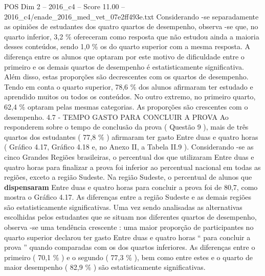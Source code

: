\begin{textsample}{POS Dim 2 – 2016\_c4 – Score 11.00 – 2016\_c4/enade\_2016\_med\_vet\_07e2ff493e.txt}
Considerando -se separadamente as opiniões de estudantes dos quatro quartos de desempenho, observa -se que, no quarto inferior, 3,2 \% ofereceram como resposta que não estudou ainda a maioria desses conteúdos, sendo 1,0 \% os do quarto superior com a mesma resposta.
A diferença entre os alunos que optaram por este motivo de dificuldade entre o primeiro e os demais quartos de desempenho é estatisticamente significativa.
Além disso, estas proporções são decrescentes com os quartos de desempenho.
Tendo em conta o quarto superior, 78,6 \% dos alunos afirmaram ter estudado e aprendido muitos ou todos os conteúdos.
No outro extremo, no primeiro quarto, 62,4 \% optaram pelas mesmas categorias.
As proporções são crescentes com o desempenho. 4.7 - TEMPO GASTO PARA CONCLUIR A PROVA Ao responderem sobre o tempo de conclusão da prova ( Questão 9 ), mais de três quartos dos estudantes ( 77,8 \% ) afirmaram ter gasto Entre duas e quatro horas ( Gráfico 4.17, Gráfico 4.18 e, no Anexo II, a Tabela II.9 ).
Considerando -se as cinco Grandes Regiões brasileiras, o percentual dos que utilizaram Entre duas e quatro horas para finalizar a prova foi inferior ao percentual nacional em todas as regiões, exceto a região Sudeste.
Na região Sudeste, o percentual de alunos que \textbf{dispensaram} Entre duas e quatro horas para concluir a prova foi de 80,7, como mostra o Gráfico 4.17.
As diferenças entre a região Sudeste e as demais regiões são estatisticamente significativas.
Uma vez sendo analisadas as alternativas escolhidas pelos estudantes que se situam nos diferentes quartos de desempenho, observa -se uma tendência crescente : uma maior proporção de participantes no quarto superior declarou ter gasto Entre duas e quatro horas “ para concluir a prova ” quando comparadas com os dos quartos inferiores.
As diferenças entre o primeiro ( 70,1 \% ) e o segundo ( 77,3 \% ), bem como entre estes e o quarto de maior desempenho ( 82,9 \% ) são estatisticamente significativas.

\end{textsample}
